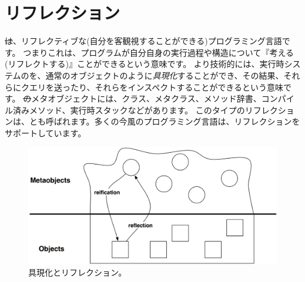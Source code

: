 \documentclass[a4paper,10pt,twoside]{book}
\begin{document}
	\renewcommand{\nnbb}[2]{} %
	\sloppy
\fi

\chapter{リフレクション}


\st は、リフレクティブな(自分を客観視することができる)プログラミング言語です。
つまりこれは、プログラムが自分自身の実行過程や構造について『考える(リフレクトする)』ことができるという意味です。
より技術的には、実行時システムのを、通常のオブジェクトのように\emph{具現化}することができ、その結果、それらにクエリを送ったり、それらをインスペクトすることができるという意味です。
\st のメタオブジェクトには、クラス、メタクラス、メソッド辞書、コンパイル済みメソッド、実行時スタックなどがあります。
このタイプのリフレクションは、とも呼ばれます。多くの今風のプログラミング言語は、リフレクションをサポートしています。

\begin{figure}[ht]\centering
	\includegraphics[width=\linewidth]{reflect}
	\caption{具現化とリフレクション。} %
\end{figure}
\end{document}

